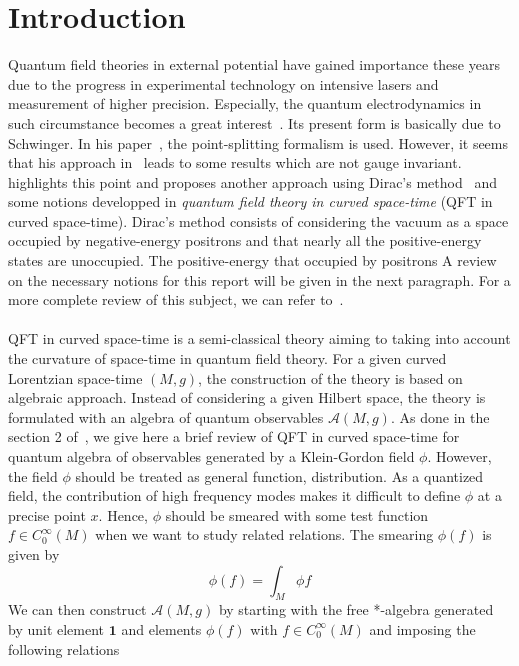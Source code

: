 \section{Introduction}
Quantum field theories in external potential have gained importance these years due to the progress in experimental technology on intensive lasers and measurement of higher precision.
Especially, the quantum electrodynamics in such circumstance becomes a great interest~\cite{Mohr1998}. 
Its present form is basically due to Schwinger. 
In his paper~\cite{Schwinger1951}, the point-splitting formalism is used. 
However, it seems that his approach in~\cite{Schwinger1951} leads to some results which are not gauge invariant. 
\cite{Zahn2015} highlights this point and proposes another approach using Dirac's method~\cite{Dirac1934} and some notions developped in \textit{quantum field theory in curved space-time} (QFT in curved space-time). 
Dirac's method consists of considering the vacuum as a space occupied by negative-energy positrons and that nearly all the positive-energy states are unoccupied.
The positive-energy that occupied by positrons 
%
A review on the necessary notions for this report will be given in the next paragraph.
For a more complete review of this subject, we can refer to~\cite{Hollands2014}. \\\\
%
QFT in curved space-time is a semi-classical theory aiming to taking into account the curvature of space-time in quantum field theory.
For a given curved Lorentzian space-time $(M,g)$,
the construction of the theory is based on algebraic approach.
Instead of considering a given Hilbert space, 
the theory is formulated with an algebra of quantum observables $\mathscr{A}(M,g)$.
As done in the section 2 of~\cite{Hollands2014}, we give here a brief review of QFT in curved space-time for quantum algebra of observables generated by a Klein-Gordon field $\phi$. 
However, the field $\phi$ should be treated as general function, \ie  distribution.
As a quantized field, the contribution of high frequency modes makes it difficult to define $\phi$ at a precise point $x$.
Hence, $\phi$ should be smeared with some test function $f\in C^\infty_0(M)$ when we want to study related relations.
The smearing $\phi(f)$ is given by
\begin{equation*}
\phi(f) = \int_M \phi f
\end{equation*}
We can then construct $\mathscr{A}(M,g)$ by starting with the free *-algebra generated by unit element $\mathbf{1}$ and elements $\phi(f)$ with $f\in C^\infty_0(M)$ and imposing the following relations \\
